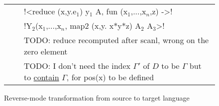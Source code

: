 \begin{figure*}[t]
\begin{tabular}{r c l}
            && !<reduce (x,y.e$_{1}$) y$_{1}$ A, fun (x$_{1}$,...,x$_n$,z) ->! \\
            && !Y$_{2}$(x$_{1}$,...,x$_n$, map2 (x,y. x*y*z) A$_{2}$ A$_{3}$>! \\
            && TODO: reduce recomputed after scanl, wrong on the zero element \\
            && TODO: I don't need the index $\Gamma'$ of $D$ to be $\Gamma$ but to \underline{contain} $\Gamma$, for pos(x) to be defined
        \end{tabular}
    \caption{Reverse-mode transformation from source to target language}
    \label{fig:direct_diff_macro}    
\end{figure*}